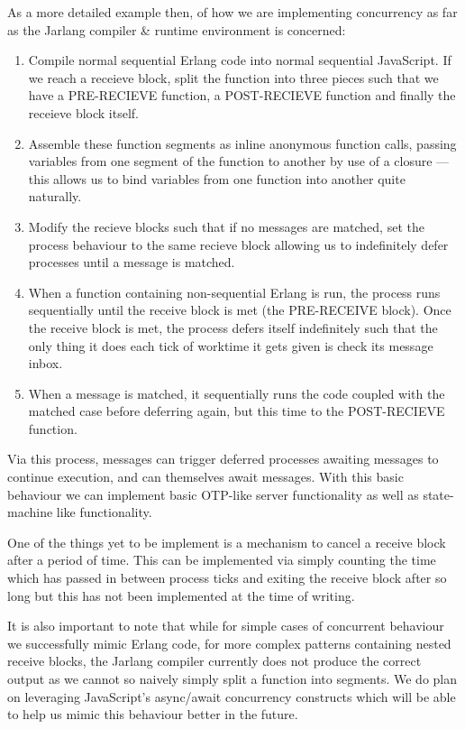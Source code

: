 \documentclass[twoside,12pt,titlepage,a4paper]{article}
\begin{document}
As a more detailed example then, of how we are implementing concurrency as far as the Jarlang compiler \& runtime environment is concerned: 

\begin{enumerate}
	\item Compile normal sequential Erlang code into normal sequential JavaScript. If we reach a receieve block, split the function into three pieces such that we have a PRE-RECIEVE function, a POST-RECIEVE function and finally the receieve block itself.
	\item Assemble these function segments as inline anonymous function calls, passing variables from one segment of the function to another by use of a closure --- this allows us to bind variables from one function into another quite naturally.
	\item Modify the recieve blocks such that if no messages are matched, set the process behaviour to the same recieve block allowing us to indefinitely defer processes until a message is matched.
	\item When a function containing non-sequential Erlang is run, the process runs sequentially until the receive block is met (the PRE-RECEIVE block). Once the receive block is met, the process defers itself indefinitely such that the only thing it does each tick of worktime it gets given is check its message inbox.
	\item When a message is matched, it sequentially runs the code coupled with the matched case before deferring again, but this time to the POST-RECIEVE function.
\end{enumerate}

Via this process, messages can trigger deferred processes awaiting messages to continue execution, and can themselves await messages. With this basic behaviour we can implement basic OTP-like server functionality as well as state-machine like functionality.

One of the things yet to be implement is a mechanism to cancel a receive block after a period of time. This can be implemented via simply counting the time which has passed in between process ticks and exiting the receive block after so long but this has not been implemented at the time of writing.

It is also important to note that while for simple cases of concurrent behaviour we successfully mimic Erlang code, for more complex patterns containing nested receive blocks, the Jarlang compiler currently does not produce the correct output as we cannot so naively simply split a function into segments. We do plan on leveraging JavaScript's async/await concurrency constructs which will be able to help us mimic this behaviour better in the future.
\end{document}
